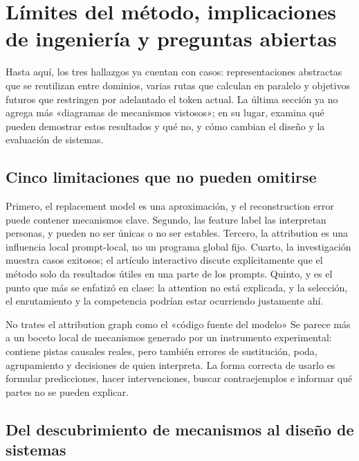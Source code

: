\section{Límites del método, implicaciones de ingeniería y preguntas abiertas}

Hasta aquí, los tres hallazgos ya cuentan con casos: representaciones abstractas que se reutilizan entre dominios, varias rutas que calculan en paralelo y objetivos futuros que restringen por adelantado el token actual. La última sección ya no agrega más «diagramas de mecanismos vistosos»; en su lugar, examina qué pueden demostrar estos resultados y qué no, y cómo cambian el diseño y la evaluación de sistemas.


\subsection{Cinco limitaciones que no pueden omitirse}

Primero, el replacement model es una aproximación, y el reconstruction error puede contener mecanismos clave. Segundo, las feature label las interpretan personas, y pueden no ser únicas o no ser estables. Tercero, la attribution es una influencia local prompt-local, no un programa global fijo. Cuarto, la investigación muestra casos exitosos; el artículo interactivo discute explícitamente que el método solo da resultados útiles en una parte de los prompts. Quinto, y es el punto que más se enfatizó en clase: la attention no está explicada, y la selección, el enrutamiento y la competencia podrían estar ocurriendo justamente ahí.

\begin{warningbox}{No trates el attribution graph como el «código fuente del modelo»}
Se parece más a un boceto local de mecanismos generado por un instrumento experimental: contiene pistas causales reales, pero también errores de sustitución, poda, agrupamiento y decisiones de quien interpreta. La forma correcta de usarlo es formular predicciones, hacer intervenciones, buscar contraejemplos e informar qué partes no se pueden explicar.
\end{warningbox}

\subsection{Del descubrimiento de mecanismos al diseño de sistemas}

